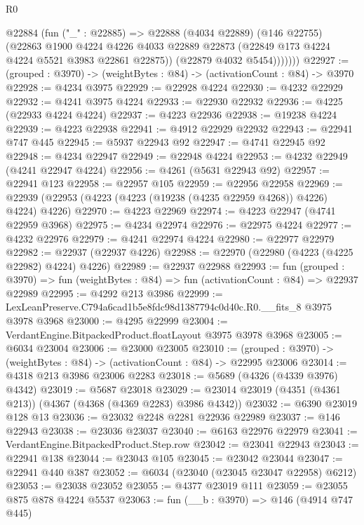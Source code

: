 \begin{lexlean}{R0}
\begin{coremodule}
            @22884
              (fun ("_" : @22885) =>
              @22888
                (@4034 @22889)
                (@146 @22755)
                (@22863
                  @1900
                  @4224
                  @4226
                  @4033
                  @22889
                  @22873
                  (@22849 @173 @4224 @4224 @5521 @3983 @22861 @22875))
                (@22879 @4032 @5454)))))))
@22927 := (grouped : @3970) -> (weightBytes : @84) -> (activationCount : @84) -> @3970
@22928 := @4234 @3975
@22929 := @22928 @4224
@22930 := @4232 @22929
@22932 := @4241 @3975 @4224
@22933 := @22930 @22932
@22936 := @4225 (@22933 @4224 @4224)
@22937 := @4223 @22936
@22938 := @19238 @4224
@22939 := @4223 @22938
@22941 := @4912 @22929 @22932
@22943 := @22941 @747 @445
@22945 := @5937 @22943 @92
@22947 := @4741 @22945 @92
@22948 := @4234 @22947
@22949 := @22948 @4224
@22953 := @4232 @22949 (@4241 @22947 @4224)
@22956 := @4261 (@5631 @22943 @92)
@22957 := @22941 @123
@22958 := @22957 @105
@22959 := @22956 @22958
@22969 := @22939 (@22953 (@4223 (@4223 (@19238 (@4235 @22959 @4268)) @4226) @4224) @4226)
@22970 := @4223 @22969
@22974 := @4223 @22947 (@4741 @22959 @3968)
@22975 := @4234 @22974
@22976 := @22975 @4224
@22977 := @4232 @22976
@22979 := @4241 @22974 @4224
@22980 := @22977 @22979
@22982 := @22937 (@22937 @4226)
@22988 := @22970 (@22980 (@4223 (@4225 @22982) @4224) @4226)
@22989 := @22937 @22988
@22993 := fun (grouped : @3970) =>
  fun (weightBytes : @84) => fun (activationCount : @84) => @22937 @22989
@22995 := @4292 @213 @3986
@22999 := LexLeanPreserve.C794a6cad1b5e8fdc98d1387794c0d40c.R0.__fits_8 @3975 @3978 @3968
@23000 := @4295 @22999
@23004 := VerdantEngine.BitpackedProduct.floatLayout @3975 @3978 @3968
@23005 := @6034 @23004
@23006 := @23000 @23005
@23010 := (grouped : @3970) -> (weightBytes : @84) -> (activationCount : @84) -> @22995 @23006
@23014 := @4318 @213 @3986 @23006 @2283
@23018 := @5689 (@4326 (@4339 @3976) @4342)
@23019 := @5687 @23018
@23029 := @23014 @23019 (@4351 (@4361 @213)) (@4367 (@4368 (@4369 @2283) @3986 @4342))
@23032 := @6390 @23019 @128 @13
@23036 := @23032 @2248 @2281 @22936 @22989
@23037 := @146 @22943
@23038 := @23036 @23037
@23040 := @6163 @22976 @22979
@23041 := VerdantEngine.BitpackedProduct.Step.row
@23042 := @23041 @22943
@23043 := @22941 @138
@23044 := @23043 @105
@23045 := @23042 @23044
@23047 := @22941 @440 @387
@23052 := @6034 (@23040 (@23045 @23047 @22958) @6212)
@23053 := @23038 @23052
@23055 := @4377 @23019 @111
@23059 := @23055 @875 @878 @4224 @5537
@23063 := fun (__b : @3970) => @146 (@4914 @747 @445)

\end{coremodule}
\end{lexlean}
